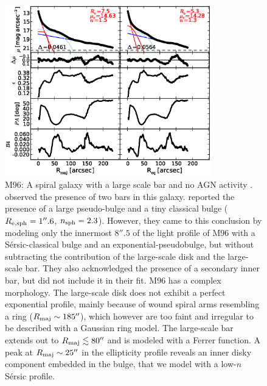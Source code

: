 \documentclass[preprint2]{emulateapj}
\newcommand{\fitfigurewidth}{0.8\textwidth}
\begin{document}
  \begin{figure}[h]
  \begin{center}
  \includegraphics[width=\fitfigurewidth]{images/m96_1Dfit.eps}
  \caption{M96:
  A spiral galaxy with a large scale bar and no AGN activity \citep{martini2003,nowak2010n3368n3489}. 
  \cite{erwin2004} observed the presence of two bars in this galaxy. 
  \cite{nowak2010n3368n3489} reported the presence of a large pseudo-bulge and a tiny classical bulge 
  ($R_{\rm e, sph} = 1''.6$, $n_{\rm sph} = 2.3$). 
  However, they came to this conclusion by modeling only the innermost $8''.5$ of the 
  light profile of M96 with a S\'ersic-classical bulge and an exponential-pseudobulge, 
  but without subtracting the contribution of the large-scale disk and the large-scale bar.
  They also acknowledged the presence of a secondary inner bar, but did not include it in their fit. 
  M96 has a complex morphology. 
  The large-scale disk does not exhibit a perfect exponential profile, 
  mainly because of wound spiral arms resembling a ring ($R_{\rm maj} \sim 185''$),
  which however are too faint and irregular to be described with a Gaussian ring model. 
  The large-scale bar extends out to $R_{\rm maj} \lesssim 80''$ and is modeled with a Ferrer function.
  A peak at $R_{\rm maj} \sim 25''$ in the ellipticity profile reveals an inner disky component embedded in the bulge, 
  that we model with a low-$n$ S\'ersic profile.
  }
  \end{center}
  \end{figure}
\end{document}
